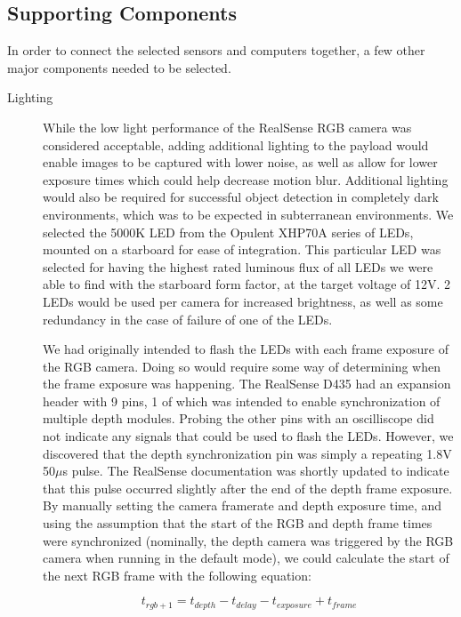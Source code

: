 \subsection{Supporting Components}

In order to connect the selected sensors and computers together, a few other major components needed to be selected. 

\begin{description}
	\item[Lighting] While the low light performance of the RealSense RGB camera was considered acceptable, adding additional lighting to the payload would enable images to be captured with lower noise, as well as allow for lower exposure times which could help decrease motion blur. Additional lighting would also be required for successful object detection in completely dark environments, which was to be expected in subterranean environments. We selected the 5000K LED from the Opulent XHP70A series of LEDs, mounted on a starboard for ease of integration. This particular LED was selected for having the highest rated luminous flux of all LEDs we were able to find with the starboard form factor, at the target voltage of 12V. 2 LEDs would be used per camera for increased brightness, as well as some redundancy in the case of failure of one of the LEDs.
	
	We had originally intended to flash the LEDs with each frame exposure of the RGB camera. Doing so would require some way of determining when the frame exposure was happening. The RealSense D435 had an expansion header with 9 pins, 1 of which was intended to enable synchronization of multiple depth modules. Probing the other pins with an oscilliscope did not indicate any signals that could be used to flash the LEDs. However, we discovered that the depth synchronization pin was simply a repeating 1.8V 50$\mu$s pulse. The RealSense documentation was shortly updated to indicate that this pulse occurred slightly after the end of the depth frame exposure. By manually setting the camera framerate and depth exposure time, and using the assumption that the start of the RGB and depth frame times were synchronized (nominally, the depth camera was triggered by the RGB camera when running in the default mode), we could calculate the start of the next RGB frame with the following equation:
	
	\begin{equation} \label{led_flashing_eq}
	t_{rgb+1} = t_{depth} - t_{delay} - t_{exposure} + t_{frame}
	\end{equation}
	

\end{description}
